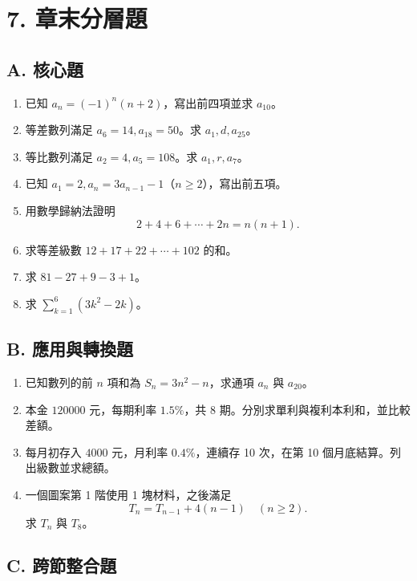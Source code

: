 \documentclass[11pt,a4paper]{article}
\providecommand{\tightlist}{%
  \setlength{\itemsep}{0pt}\setlength{\parskip}{0pt}}
\begin{document}
\section{7. 章末分層題}\label{ux7ae0ux672bux5206ux5c64ux984c}

\subsection{A. 核心題}\label{a.-ux6838ux5fc3ux984c}

\begin{enumerate}
\def\labelenumi{\arabic{enumi}.}
\tightlist
\item
  已知 \(a_n=(-1)^n(n+2)\)，寫出前四項並求 \(a_{10}\)。
\item
  等差數列滿足 \(a_6=14,a_{18}=50\)。求 \(a_1,d,a_{25}\)。
\item
  等比數列滿足 \(a_2=4,a_5=108\)。求 \(a_1,r,a_7\)。
\item
  已知 \(a_1=2,a_n=3a_{n-1}-1\)（\(n\ge2\)），寫出前五項。
\item
  用數學歸納法證明
  \[
  2+4+6+\cdots+2n=n(n+1).
  \]
\item
  求等差級數 \(12+17+22+\cdots+102\) 的和。
\item
  求 \(81-27+9-3+1\)。
\item
  求 \(\displaystyle\sum_{k=1}^{6}(3k^2-2k)\)。
\end{enumerate}

\subsection{B. 應用與轉換題}\label{b.-ux61c9ux7528ux8207ux8f49ux63dbux984c}

\begin{enumerate}
\def\labelenumi{\arabic{enumi}.}
\setcounter{enumi}{8}
\tightlist
\item
  已知數列的前 \(n\) 項和為 \(S_n=3n^2-n\)，求通項 \(a_n\) 與 \(a_{20}\)。
\item
  本金 \(120000\) 元，每期利率 \(1.5\%\)，共 8 期。分別求單利與複利本利和，並比較差額。
\item
  每月初存入 \(4000\) 元，月利率 \(0.4\%\)，連續存 10 次，在第 10 個月底結算。列出級數並求總額。
\item
  一個圖案第 1 階使用 1 塊材料，之後滿足
  \[
  T_n=T_{n-1}+4(n-1)\quad(n\ge2).
  \]
  求 \(T_n\) 與 \(T_8\)。
\end{enumerate}

\subsection{C. 跨節整合題}\label{c.-ux8de8ux7bc0ux6574ux5408ux984c}
\end{document}
